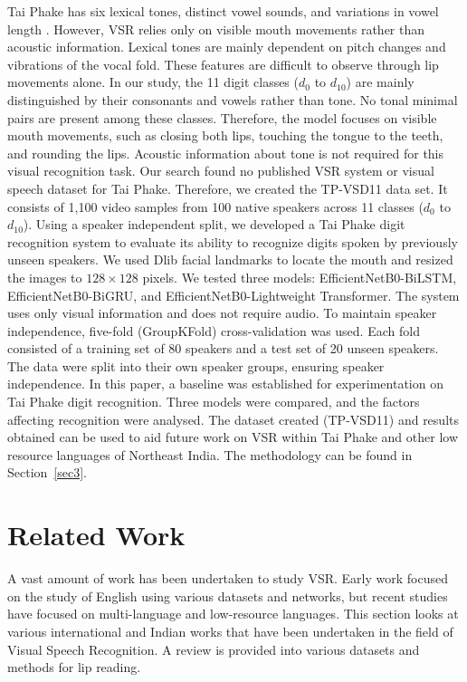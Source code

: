 \documentclass[journal]{IEEEtran}
\begin{document}
Tai Phake has six lexical tones, distinct vowel sounds, and variations in vowel length \cite{morey2020syllable}. However, VSR relies only on visible mouth movements rather than  acoustic information. Lexical tones are mainly dependent on pitch changes and vibrations of the vocal fold. These features are difficult to observe through lip movements alone. In our study, the 11 digit classes ($d_0$ to $d_{10}$) are mainly distinguished by their consonants and vowels rather than tone. No tonal minimal pairs are present among these classes. Therefore, the model focuses on visible mouth movements, such as closing both lips, touching the tongue to the teeth, and rounding the lips. Acoustic information about tone is not required for this visual recognition task. Our search found no published VSR system or visual speech dataset for Tai Phake. Therefore, we created the TP-VSD11 data set. It consists of 1,100 video samples from 100 native speakers across 11 classes ($d_0$ to $d_{10}$). Using a speaker independent split, we developed a Tai Phake digit recognition system to evaluate its ability to recognize digits spoken by previously unseen speakers. We used Dlib facial landmarks to locate the mouth and resized the images to $128 \times 128$ pixels. We tested three models: EfficientNetB0-BiLSTM, EfficientNetB0-BiGRU, and EfficientNetB0-Lightweight Transformer. The system uses only visual information and does not require audio. To maintain speaker independence, five-fold (GroupKFold) cross-validation was used. Each fold consisted of a training set of 80 speakers and a test set of 20 unseen speakers. The data were split into their own speaker groups, ensuring speaker independence. In this paper, a baseline was established for experimentation on Tai Phake digit recognition. Three models were compared, and the factors affecting recognition were analysed. The dataset created (TP-VSD11) and results obtained can be used to aid future work on VSR within Tai Phake and other low resource languages of Northeast India. The methodology can be found in Section~\ref{sec3}.

\section{Related Work} \label{sec2}

A vast amount of work has been undertaken to study VSR. Early work focused on the study of English using various datasets and networks, but recent studies have focused on multi-language and low-resource languages. This section looks at various international and Indian works that have been undertaken in the field of Visual Speech Recognition. A review is provided into various datasets and methods for lip reading.
\end{document}
